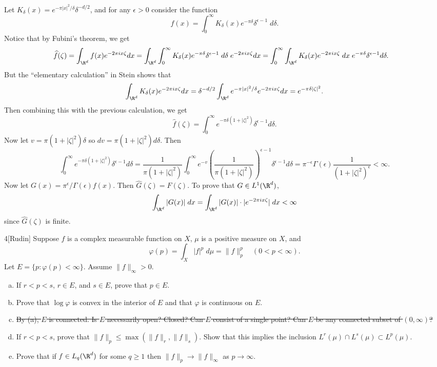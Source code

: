 \documentclass[11pt,letterpaper]{article}
\begin{document}
\begin{solution}
    Let $K_\delta(x)=e^{-\pi|x|^2 /\delta}\delta^{-d /2}$, and for any $\epsilon>0$ consider the function
    \[
        f(x)=\int^\infty_0 K_\delta(x)e^{-\pi \delta}\delta^{\epsilon-1}\;d\delta
    .\] 
    Notice that by Fubini's theorem, we get
    \[
        \begin{aligned}
            \widehat{f}(\zeta)&=\int_{\R^d}f(x)e^{-2\pi i x \zeta}dx=\int_{\R^d}\int^\infty_0 K_\delta(x)e^{-\pi \delta}\delta^{\epsilon-1}\;d\delta\; e^{-2\pi i x \zeta}dx=\int^\infty_0 \int_{\R^d}K_\delta(x)e^{-2\pi i x \zeta}\;dx\;e^{-\pi \delta}\delta^{\epsilon-1}d\delta.
        \end{aligned}
    \] 
    But the ``elementary calculation'' in Stein shows that
    \[
        \int_{\R^d} K_\delta(x)e^{-2\pi i x \zeta}dx=\delta^{-d /2}\int_{\R^d} e^{-\pi|x|^2 /\delta} e^{-2\pi i x \zeta}dx=e^{-\pi\delta|\zeta|^2}
    .\] 
    Then combining this with the previous calculation, we get
    \[
        \widehat{f}(\zeta)=\int_0^\infty e^{-\pi\delta(1+|\zeta|^2)}\delta^{\epsilon-1}d\delta
    .\] 
    Now let $v=\pi(1+|\zeta|^2)\delta$ so $dv=\pi(1+|\zeta|^2)d\delta$. Then
    \[
        \int_0^\infty e^{-\pi\delta(1+|\zeta|^2)}\delta^{\epsilon-1}d\delta = \frac{1}{\pi(1+|\zeta|^2)}\int_0^\infty e^{-v}\left(\frac{1}{\pi(1+|\zeta|^2)}\right)^{\epsilon-1}\delta^{\epsilon-1}d\delta = \pi^{-\epsilon}\Gamma(\epsilon)\frac{1}{(1+|\zeta|^2)^\epsilon}<\infty
    .\] 
    Now let $G(x)=\pi^\epsilon /\Gamma(\epsilon) f(x)$. Then $\widehat{G}(\zeta)=F(\zeta)$. To prove that $G\in L^1(\R^d)$,
    \[
        \int_{\R^d}|G(x)|\;dx=\int_{\R^d}|G(x)|\cdot |e^{-2\pi i x\zeta}|\;dx<\infty
    \]
    since $\widehat{G}(\zeta)$ is finite.  
\end{solution}

\begin{cproblem}{4}[Rudin] Suppose $f$ is a complex measurable function on $X$, $\mu$ is a positive measure on $X$, and 
    \[
        \varphi(p)=\int_X |f|^p\;d\mu = \|f\|^p_p\quad (0<p<\infty)
    .\] 
    Let $E=\{p : \varphi(p)<\infty\}$. Assume $\|f\|_\infty > 0$.
    \begin{enumerate}[(a)]
        \item If $r < p < s$, $r\in E$, and $s\in E$, prove that $p\in E$.
        \item Prove that $\log \varphi$ is convex in the interior of $E$ and that $\varphi$ is continuous on $E$.
        \item \sout{By (a), $E$ is connected. Is $E$ necessarily open? Closed? Can $E$ consist of a single point? Can $E$ be any connected subset of $(0,\infty)$?}
        \item If $r < p < s$, prove that $\|f\|_p \leq \max (\|f\|_r, \|f\|_s)$. Show that this implies the inclusion $L^r(\mu) \cap L^s(\mu) \subset L^p(\mu)$.
        \item Prove that if $f\in L_q(\R^d)$ for some $q\geq 1$ then $\|f\|_p \to \|f\|_\infty$ as $p\to \infty$.
    \end{enumerate} 
\end{cproblem}
\end{document}
